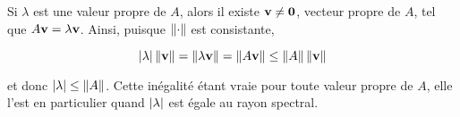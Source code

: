 Si $\lambda$ est une valeur propre de $A$, alors il existe $\mathbf{v} \neq \mathbf{0}$, vecteur propre de $A$, tel que $A \mathbf{v} = \lambda \mathbf{v}$.
Ainsi, puisque $\left\lVert\cdot\right\rVert$ est consistante,

\begin{equation*}
  \left\lvert\lambda\right\rvert \left\lVert\mathbf{v}\right\rVert
  = \left\lVert\lambda \mathbf{v}\right\rVert
  = \left\lVert A \mathbf{v}\right\rVert
  \leq \left\lVert A\right\rVert \left\lVert\mathbf{v}\right\rVert
\end{equation*}

et donc $\left\lvert\lambda\right\rvert \leq \left\lVert A\right\rVert$.
Cette inégalité étant vraie pour toute valeur propre de $A$, elle l'est en particulier quand $\left\lvert\lambda\right\rvert$ est égale au rayon spectral.